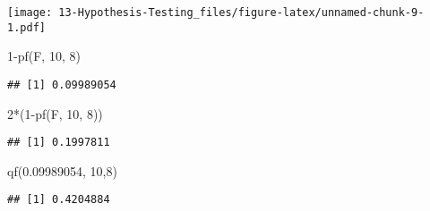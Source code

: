\documentclass[
]{book}
\newenvironment{Shaded}{\begin{snugshade}}{\end{snugshade}}
\newcommand{\DecValTok}[1]{\textcolor[rgb]{0.00,0.00,0.81}{#1}}
\newcommand{\FloatTok}[1]{\textcolor[rgb]{0.00,0.00,0.81}{#1}}
\newcommand{\FunctionTok}[1]{\textcolor[rgb]{0.00,0.00,0.00}{#1}}
\newcommand{\NormalTok}[1]{#1}
\newcommand{\SpecialCharTok}[1]{\textcolor[rgb]{0.00,0.00,0.00}{#1}}
\begin{document}
\texttt{[image: 13-Hypothesis-Testing\_files/figure-latex/unnamed-chunk-9-1.pdf]}

\begin{Shaded}
\begin{Highlighting}[]
\DecValTok{1}\SpecialCharTok{{-}}\FunctionTok{pf}\NormalTok{(F, }\DecValTok{10}\NormalTok{, }\DecValTok{8}\NormalTok{)}
\end{Highlighting}
\end{Shaded}

\begin{verbatim}
## [1] 0.09989054
\end{verbatim}

\begin{Shaded}
\begin{Highlighting}[]
\DecValTok{2}\SpecialCharTok{*}\NormalTok{(}\DecValTok{1}\SpecialCharTok{{-}}\FunctionTok{pf}\NormalTok{(F, }\DecValTok{10}\NormalTok{, }\DecValTok{8}\NormalTok{))}
\end{Highlighting}
\end{Shaded}

\begin{verbatim}
## [1] 0.1997811
\end{verbatim}

\begin{Shaded}
\begin{Highlighting}[]
\FunctionTok{qf}\NormalTok{(}\FloatTok{0.09989054}\NormalTok{, }\DecValTok{10}\NormalTok{,}\DecValTok{8}\NormalTok{)}
\end{Highlighting}
\end{Shaded}

\begin{verbatim}
## [1] 0.4204884
\end{verbatim}
\end{document}
